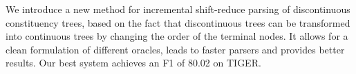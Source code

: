 We introduce a new method for incremental shift-reduce parsing of discontinuous constituency trees, based on the fact that discontinuous trees can be transformed into continuous trees by changing the order of the terminal nodes. It allows for a clean formulation of different oracles, leads to faster parsers and provides better results. Our best system achieves an F1 of 80.02 on TIGER.
